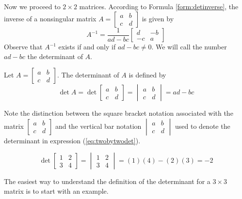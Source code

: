 \documentclass{ximera}
\begin{document}
Now we proceed to $2\times 2$ matrices.  According to Formula \ref{form:detinverse}, the inverse of a nonsingular matrix $A=\begin{bmatrix}a&b\\c&d\end{bmatrix}$ is given by
$$A^{-1}=\frac{1}{ad-bc}\begin{bmatrix}d&-b\\-c&a\end{bmatrix}$$
Observe that $A^{-1}$ exists if and only if $ad-bc\neq 0$.  We will call the number $ad-bc$ the determinant of $A$.

\begin{definition}\label{def:twobytwodet}
Let $A=\begin{bmatrix}a&b\\c&d\end{bmatrix}$.  The determinant of $A$ is defined by 
\begin{equation}\label{eq:twobytwodet}\det{A}=\det{\begin{bmatrix}a&b\\c&d\end{bmatrix}}=\begin{vmatrix}a&b\\c&d\end{vmatrix}=ad-bc\end{equation}
\end{definition}
Note the distinction between the square bracket notation associated with the matrix $\begin{bmatrix}a&b\\c&d\end{bmatrix}$ and the vertical bar notation $\begin{vmatrix}a&b\\c&d\end{vmatrix}$ used to denote  the determinant in expression (\ref{eq:twobytwodet}).

\begin{example}\label{ex:2x2det}
$$\det{\begin{bmatrix}1&2\\3&4\end{bmatrix}}=\begin{vmatrix}1&2\\3&4\end{vmatrix}=(1)(4)-(2)(3)=-2$$
\end{example}

The easiest way to understand the definition of the determinant for a $3\times 3$ matrix is to start with an example.
\end{document}
